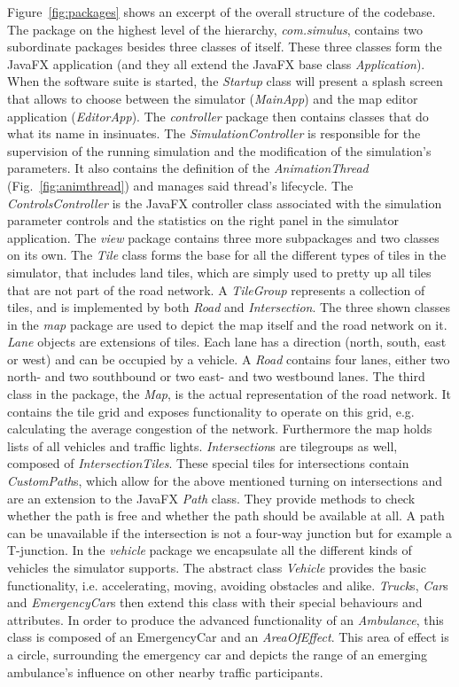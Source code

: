 Figure~\ref{fig:packages} shows an excerpt of the overall structure of the codebase. The package on the highest level of the hierarchy, \textit{com.simulus}, contains two subordinate packages besides three classes of itself. These three classes form the JavaFX application (and they all extend the JavaFX base class \textit{Application}). When the software suite is started, the \textit{Startup} class will present a splash screen that allows to choose between the simulator (\textit{MainApp}) and the map editor application (\textit{EditorApp}).
The \textit{controller} package then contains classes that do what its name in insinuates. The \textit{SimulationController} is responsible for the supervision of the running simulation and the modification of the simulation's parameters.  It also contains the definition of the \textit{AnimationThread} (Fig.~\ref{fig:animthread}) and manages said thread's lifecycle. The \textit{ControlsController} is the JavaFX controller class associated with the simulation parameter controls and the statistics on the right panel in the simulator application. 
The \textit{view} package contains three more subpackages and two classes on its own. The \textit{Tile} class forms the base for all the different types of tiles in the simulator, that includes land tiles, which are simply used to pretty up all tiles that are not part of the road network. A \textit{TileGroup} represents a collection of tiles, and is implemented by both \textit{Road} and \textit{Intersection}.  The three shown classes in the \textit{map} package are used to depict the map itself and the road network on it. \textit{Lane} objects are extensions of tiles. Each lane has a direction (north, south, east or west) and can be occupied by a vehicle. A \textit{Road} contains four lanes, either two north- and two southbound or two east- and two westbound lanes. The third class in the package, the \textit{Map}, is the actual representation of the road network. It contains the tile grid and exposes functionality to operate on this grid, e.g. calculating the average congestion of the network. Furthermore the map holds lists of all vehicles and traffic lights. \textit{Intersection}s are tilegroups as well, composed of \textit{IntersectionTiles}. These special tiles for intersections contain \textit{CustomPath}s, which allow for the above mentioned turning on intersections and are an extension to the JavaFX \textit{Path} class. They provide methods to check whether the path is free and whether the path should be available at all. A path can be unavailable if the intersection is not a four-way junction but for example a T-junction.  
In the \textit{vehicle} package we encapsulate all the different kinds of vehicles the simulator supports. The abstract class \textit{Vehicle} provides the basic functionality, i.e. accelerating, moving, avoiding obstacles and alike. \textit{Truck}s, \textit{Car}s and \textit{EmergencyCar}s then extend this class with their special behaviours and attributes. In order to produce the advanced functionality of an \textit{Ambulance}, this class is composed of an EmergencyCar and an \textit{AreaOfEffect}. This area of effect is a circle, surrounding the emergency car and depicts the range of an emerging ambulance's influence on other nearby traffic participants.

